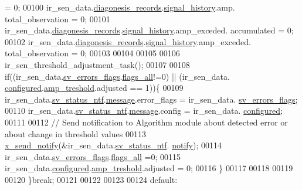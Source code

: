\begin{DoxyCode}
                       = 0;
00100               ir\_sen\_data.\hyperlink{a00023_a7ae905b560513ad201e58c2f63375030}{diagonesis\_records}.\hyperlink{a00017_affb63906d23cb1cb7787d61eaaedfb60}{signal\_history}.amp.
      total\_observation           = 0;
00101               ir\_sen\_data.\hyperlink{a00023_a7ae905b560513ad201e58c2f63375030}{diagonesis\_records}.\hyperlink{a00017_affb63906d23cb1cb7787d61eaaedfb60}{signal\_history}.amp\_exceded.
      accumulated         = 0;
00102               ir\_sen\_data.\hyperlink{a00023_a7ae905b560513ad201e58c2f63375030}{diagonesis\_records}.\hyperlink{a00017_affb63906d23cb1cb7787d61eaaedfb60}{signal\_history}.amp\_exceded.
      total\_observation   = 0;
00103 
00104 
00105            
00106              ir\_sen\_threshold\_adjustment\_task();
00107 
00108             \textcolor{keywordflow}{if}((ir\_sen\_data.\hyperlink{a00023_aaeec6b0609dba31393f337abf1cce3d3}{sv\_errors\_flags}.\hyperlink{a00022_a1caa87b00c878186140c3bac9c8acf3b}{flags\_all}!=0)  || (ir\_sen\_data.
      \hyperlink{a00023_a94b2d1f6ea4ab334c74d24984dd27843}{configured}.\hyperlink{a00021_a4b3bbfb0267daea1432f2603825ade62}{amp\_treshold}.adjusted == 1))\{
00109              ir\_sen\_data.\hyperlink{a00023_afdc0e2c51e8e301d264700f4f9c10740}{sv\_status\_ntf}.\hyperlink{a00021_a13393a2d1589483b3bae4d2e79f43980}{message}.error\_flags = ir\_sen\_data.
      \hyperlink{a00023_aaeec6b0609dba31393f337abf1cce3d3}{sv\_errors\_flags};
00110              ir\_sen\_data.\hyperlink{a00023_afdc0e2c51e8e301d264700f4f9c10740}{sv\_status\_ntf}.\hyperlink{a00021_a13393a2d1589483b3bae4d2e79f43980}{message}.config = ir\_sen\_data.
      \hyperlink{a00023_a94b2d1f6ea4ab334c74d24984dd27843}{configured};
00111 
00112              \textcolor{comment}{// Send notification to Algorithm module about detected error or about change in threshold
       values}
00113              \hyperlink{a00036_ae17b0bb16da3c471bb6074bb4c4d0fee}{x\_send\_notify}(&ir\_sen\_data.\hyperlink{a00023_afdc0e2c51e8e301d264700f4f9c10740}{sv\_status\_ntf}.
      \hyperlink{a00021_a8e6a04c2283f9fd7b8dcbc62faba5847}{notify});
00114              ir\_sen\_data.\hyperlink{a00023_aaeec6b0609dba31393f337abf1cce3d3}{sv\_errors\_flags}.\hyperlink{a00022_a1caa87b00c878186140c3bac9c8acf3b}{flags\_all} =0;
00115              ir\_sen\_data.\hyperlink{a00023_a94b2d1f6ea4ab334c74d24984dd27843}{configured}.\hyperlink{a00021_a4b3bbfb0267daea1432f2603825ade62}{amp\_treshold}.adjusted = 0;
00116             \}
00117 
00118 
00119 
00120         \}\textcolor{keywordflow}{break};
00121 
00122 
00123 
00124         \textcolor{keywordflow}{default}:

\end{DoxyCode}
